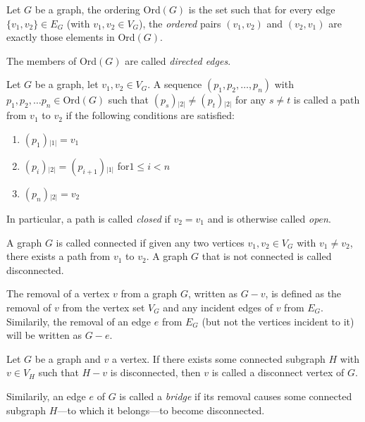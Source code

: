 \documentclass[twoside]{book}
\newcommand{\coordinate}[1][1]{\ensuremath{{_{|{#1}|}}}}
\newenvironment{definition}[1][Definition]{\begin{trivlist}
\item[\hskip \labelsep {\bfseries Definition (#1):}]}{\end{trivlist}}
\begin{document}
\begin{definition}[Ordering of a Graph]

Let $ G $ be a graph, the ordering Ord$ (G) $ is the set such that for every edge
$ \{v_1, v_2\}\in E_G $ (with $ v_1, v_2\in V_G $), the \emph{ordered} pairs
$ (v_1, v_2) $ and $ (v_2, v_1) $ are exactly those elements in Ord$ (G) $.

\end{definition}
The members of Ord$ (G) $ are called \emph{directed edges}.

\begin{definition}[Path]

Let $ G $ be a graph, let $ v_1, v_2\in V_G $.  A sequence $ (p_1, p_2,\ldots, p_n ) $
with $ p_1, p_2,\ldots p_n\in\mbox{Ord}(G) $ such that $ (p_s)\coordinate[2]\neq (p_t)\coordinate[2] $
for any $ s\neq t $ is called a path from $ v_1 $ to $ v_2 $ if the following conditions
are satisfied: 

\begin{enumerate}

\item $ (p_1)\coordinate=v_1 $

\item $ (p_i)\coordinate[2]=(p_{i+1})\coordinate $ \quad for\quad $ 1\le i < n $

\item $ (p_n)\coordinate[2]=v_2 $

\end{enumerate}

In particular, a path is called \emph{closed} if $ v_2=v_1 $ and is otherwise called \emph{open}.

\end{definition}

\begin{definition}[Connected Graph]

A graph $ G $ is called connected if given any two vertices $ v_1, v_2\in V_G $ with $ v_1\neq v_2 $,
there exists a path from $ v_1 $ to $ v_2 $.  A graph $ G $ that is not connected is called disconnected.

\end{definition}
The removal of a vertex $ v $ from a graph $ G $, written as $ G-v $, is defined as the removal of $ v $ from
the vertex set $ V_G $ and any incident edges of $ v $ from $ E_G $.  Similarily, the removal of an edge $ e $
from $ E_G $ (but not the vertices incident to it) will be written as $ G-e $.

\begin{definition}[Disconnect Vertex]

Let $ G $ be a graph and $ v $ a vertex.  If there exists some connected subgraph $ H $ with $ v\in V_H $ such that
$ H-v $ is disconnected, then $ v $ is called a disconnect vertex of $ G $.

\end{definition}
Similarily, an edge $ e $ of $ G $ is called a \emph{bridge} if its removal causes some connected subgraph
$ H $---to which it belongs---to become disconnected.
\end{document}
